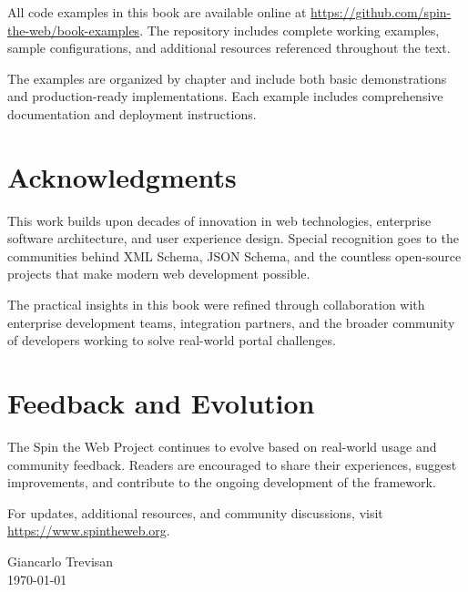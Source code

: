 All code examples in this book are available online at \url{https://github.com/spin-the-web/book-examples}. The repository includes complete working examples, sample configurations, and additional resources referenced throughout the text.

The examples are organized by chapter and include both basic demonstrations and production-ready implementations. Each example includes comprehensive documentation and deployment instructions.

\section*{Acknowledgments}

This work builds upon decades of innovation in web technologies, enterprise software architecture, and user experience design. Special recognition goes to the communities behind XML Schema, JSON Schema, and the countless open-source projects that make modern web development possible.

The practical insights in this book were refined through collaboration with enterprise development teams, integration partners, and the broader community of developers working to solve real-world portal challenges.

\section*{Feedback and Evolution}

The Spin the Web Project continues to evolve based on real-world usage and community feedback. Readers are encouraged to share their experiences, suggest improvements, and contribute to the ongoing development of the framework.

For updates, additional resources, and community discussions, visit \url{https://www.spintheweb.org}.

\vspace{1cm}
\hfill Giancarlo Trevisan \\
\hfill \today

\clearpage
